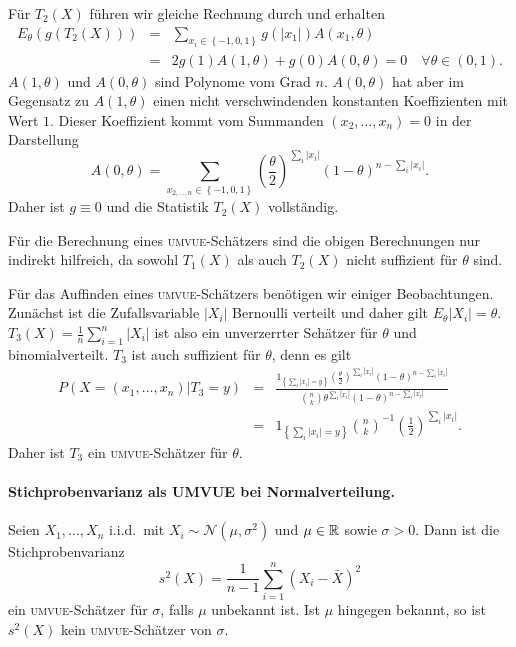 Für $T_2\left( X \right)$ führen wir gleiche Rechnung durch und erhalten
\begin{eqnarray}
	E_\theta(g\left( T_2\left( X \right) \right)) &=& \sum_{x_i\in\left\{ -1,0,1 \right\}}^{} g(|x_1|) A\left( x_1, \theta \right) \\
	&=& 2 g(1) A(1,\theta) + g(0) A(0,\theta) = 0 \quad \forall\theta\in (0,1).
\end{eqnarray}
$A(1,\theta)$ und $A(0,\theta)$ sind Polynome vom Grad $n$. $A(0,\theta)$ hat aber im Gegensatz zu $A(1,\theta)$ 
einen nicht verschwindenden konstanten Koeffizienten mit Wert $1$. Dieser Koeffizient kommt vom Summanden $(x_2,\ldots,x_n)=0$
in der Darstellung
\begin{equation}
	A(0, \theta) = \sum_{x_{2,\ldots,n}\in\left\{ -1,0,1 \right\}}^{}\left( \frac{\theta}{2} \right)^{\sum_{i}^{} |x_i|}\left( 1-\theta \right)^{n-\sum_{i}^{} |x_i|}.
\end{equation}
Daher ist $g\equiv 0$ und die Statistik $T_2(X)$ vollständig. 

Für die Berechnung eines \textsc{umvue}-Schätzers sind die obigen Berechnungen nur indirekt 
hilfreich, da sowohl $T_1(X)$ als auch $T_2(X)$ nicht suffizient für $\theta$ sind. 

Für das Auffinden eines \textsc{umvue}-Schätzers benötigen wir einiger Beobachtungen. 
Zunächst ist die Zufallsvariable $|X_i|$ Bernoulli verteilt und daher gilt $E_\theta |X_i|=\theta$.
$T_3(X)= \frac{1}{n} \sum_{i=1}^{n} |X_i|$ ist also ein unverzerrter Schätzer für $\theta$ und
binomialverteilt. 
$T_3$ ist auch suffizient für $\theta$, denn es gilt
\begin{eqnarray}
	P( X=\left( x_1,\ldots,x_n \right)| T_3=y) &=& \frac{ 1_{ \left\{ \sum_{i}^{} |x_i|=y \right\} } \left( \frac{\theta}{2} \right)^{\sum_{i}^{} |x_i|}  \left( 1-\theta \right)^{n-\sum_{i}^{} |x_i| }   }{ \binom{n}{k} \theta^{\sum_{i}^{} |x_i|   } (1-\theta)^{n-\sum_{i}^{} |x_i|}        } \\
	&=& 1_{ \left\{ \sum_{i}^{} |x_i|=y \right\} } \binom{n}{k}^{-1} \left( \frac{1}{2} \right)^{\sum_{i}^{} |x_i|}.
\end{eqnarray}
Daher ist $T_3$ ein \textsc{umvue}-Schätzer für $\theta$.





\paragraph{Stichprobenvarianz als UMVUE bei Normalverteilung.} 
Seien $X_1,\ldots,X_n$ i.i.d.\ mit $X_i \sim \mathcal N(\mu,\sigma^2)$ und
$\mu\in\mathbb R$ sowie $\sigma>0$.  Dann ist die Stichprobenvarianz 
\begin{equation}
	s^2(X) = \frac{1}{n-1} \sum_{i=1}^{n} (X_i - \bar X)^2
\end{equation}
ein \textsc{umvue}-Schätzer für $\sigma$, falls $\mu$ unbekannt ist. 
Ist $\mu$ hingegen bekannt, so ist $s^2(X)$ kein \textsc{umvue}-Schätzer
von $\sigma$. 

